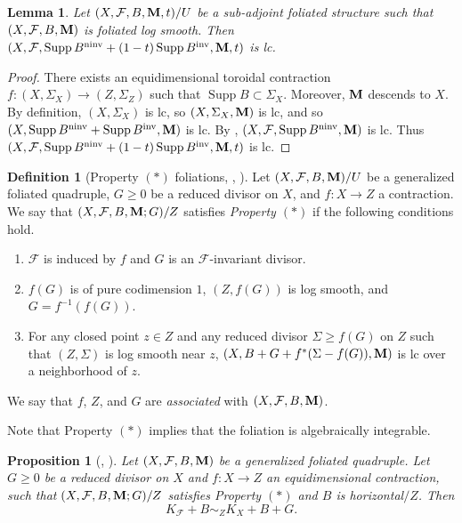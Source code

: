 \documentclass[12pt]{amsart}
\numberwithin{equation}{section}
\newcommand{\Mm}{{\bf{M}}}
\newcommand{\ninv}{\operatorname{ninv}}
\newcommand{\inv}{\operatorname{inv}}
\newcommand{\Supp}{\operatorname{Supp}}
\newcommand{\Ff}{\mathcal{F}}
\newtheorem{lem}[thm]{Lemma}
\newtheorem{prop}[thm]{Proposition}
\theoremstyle{definition}
\newtheorem{defn}[thm]{Definition}
\theoremstyle{definition}
\theoremstyle{definition}
\begin{document}
\begin{lem}\label{lem: foliated log smooth imply lc}
Let $(X,\Ff,B,\Mm,t)/U$ be a sub-adjoint foliated structure such that $(X,\Ff,B,\Mm)$ is foliated log smooth. Then $(X,\Ff,\Supp B^{\ninv}+(1-t)\Supp B^{\inv},\Mm,t)$ is lc.
\end{lem}
\begin{proof}
There exists an equidimensional toroidal contraction $f: (X,\Sigma_X)\rightarrow (Z,\Sigma_Z)$ such that $\Supp B\subset\Sigma_X$. Moreover, $\Mm$ descends to $X$. By definition, $(X,\Sigma_X)$ is lc, so $(X,\Sigma_X,\Mm)$ is lc, and so $(X,\Supp B^{\ninv}+\Supp B^{\inv},\Mm)$ is lc. By \cite[Lemma 6.2.2]{CHLX23}, $(X,\Ff,\Supp B^{\ninv},\Mm)$ is lc. Thus $(X,\Ff,\Supp B^{\ninv}+(1-t)\Supp B^{\inv},\Mm,t)$ is lc.
\end{proof}



\begin{defn}[Property $(\ast )$ foliations, {\cite[Definition 3.8]{ACSS21}, \cite[Definition 7.2.2]{CHLX23}}]\label{defn: foliation property *}
Let $(X,\Ff,B,\Mm)/U$ be a generalized foliated quadruple, $G\geq 0$ be a reduced divisor on $X$, and $f: X\rightarrow Z$ a contraction. We say that $(X,\Ff,B,\Mm;G)/Z$ satisfies \emph{Property $(\ast )$} if the following conditions hold.
\begin{enumerate}
\item $\Ff$ is induced by $f$ and $G$ is an $\Ff$-invariant divisor.
\item $f(G)$ is of pure codimension $1$, $(Z,f(G))$ is log smooth, and $G=f^{-1}(f(G))$.
\item For any closed point $z\in Z$ and any reduced divisor  $\Sigma\ge f(G)$ on $Z$ such that  $(Z,\Sigma)$ is log smooth near $z$, $(X,B+G+f^\ast (\Sigma-f(G)),\Mm)$ is lc over a neighborhood of $z$.
\end{enumerate}
We say that $f$, $Z$, and $G$ are \emph{associated} with $(X,\Ff,B,\Mm)$. 

Note that Property $(\ast )$ implies that the foliation is algebraically integrable. 
\end{defn}

\begin{prop}[{\cite[Proposition 3.6]{ACSS21}, \cite[Proposition 7.3.6]{CHLX23}}]\label{prop: weak cbf gfq}
Let $(X,\Ff,B,\Mm)$ be a generalized foliated quadruple. Let  $G\geq 0$ be a reduced divisor on $X$ and $f: X\rightarrow Z$ an equidimensional contraction, such that $(X,\Ff,B,\Mm;G)/Z$ satisfies Property $(\ast )$ and $B$ is horizontal$/Z$. Then
$$K_{\Ff}+B\sim_{Z}K_X+B+G.$$
\end{prop}
\end{document}

